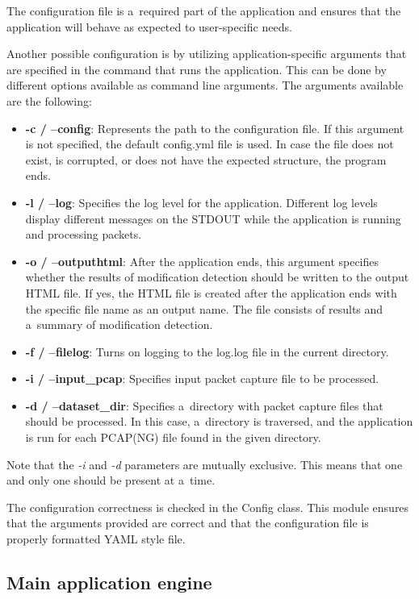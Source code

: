 \documentclass[
  printed,     %
  color,       %
  oneside,     %
  nosansbold,  %
  nocolorbold, %
  nolof,         %
  nolot,         %
]{fithesis4}
\begin{document}
The configuration file is a~required part of the application and ensures that the application will behave as expected to user-specific needs.

Another possible configuration is by utilizing application-specific arguments that are specified in the command that runs the application. This can be done by different options available as command line arguments. The arguments available are the following:

\begin{itemize}[noitemsep,topsep=0pt]
    \item \textbf{-c / --config}: Represents the path to the configuration file. If this argument is not specified, the default config.yml file is used. In case the file does not exist, is corrupted, or does not have the expected structure, the program ends.
    \item \textbf{-l / --log}: Specifies the log level for the application. Different log levels display different messages on the STDOUT while the application is running and processing packets.
    \item \textbf{-o / --outputhtml}: After the application ends, this argument specifies whether the results of modification detection should be written to the output HTML file. If yes, the HTML file is created after the application ends with the specific file name as an output name. The file consists of results and a~summary of modification detection.
    \item \textbf{-f / --filelog}: Turns on logging to the log.log file in the current directory.
    \item \textbf{-i / --input\_pcap}: Specifies input packet capture file to be processed.
    \item \textbf{-d / --dataset\_dir}: Specifies a~directory with packet capture files that should be processed. In this case, a~directory is traversed, and the application is run for each PCAP(NG) file found in the given directory.
\end{itemize}

Note that the \textit{-i} and \textit{-d} parameters are mutually exclusive. This means that one and only one should be present at a~time.

\medskip

The configuration correctness is checked in the Config class. This module ensures that the arguments provided are correct and that the configuration file is properly formatted YAML style file.

\subsection{Main application engine}
\end{document}
